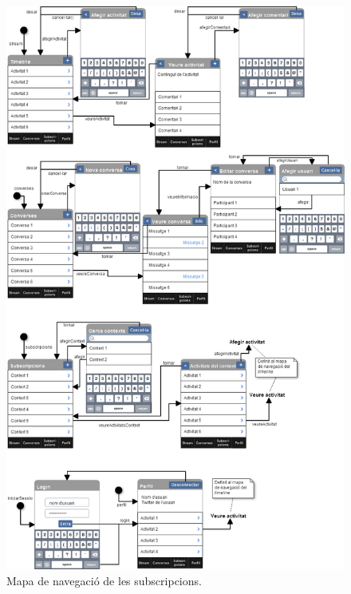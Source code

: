 \begin{figure}[ht]
    \centering
    \includegraphics*[scale=0.5,viewport=0 340 850 760]{Memoria/Arquitectura/Projecte/Presentacio/mapa_de_navegacio.png}
    \caption[Mapa de navegació de les subscripcions.]{Mapa de navegació de les subscripcions.}
    \label{fig:mapa_nav_subscripcions}
\end{figure}
\FloatBarrier

